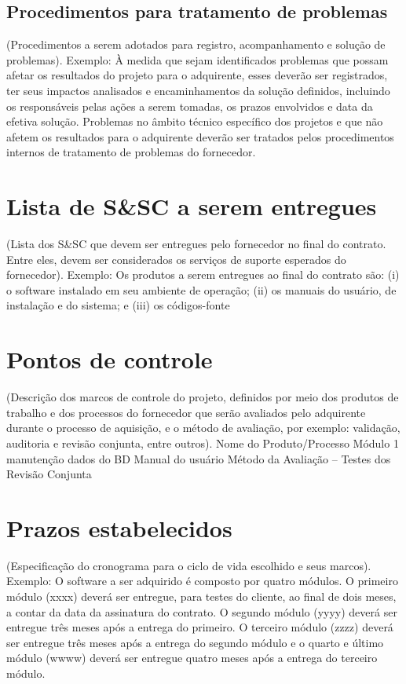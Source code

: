 \subsection{Procedimentos para tratamento de problemas}
(Procedimentos a serem adotados para registro, acompanhamento e
solução de problemas).
Exemplo: À medida que sejam identificados problemas que possam afetar os
resultados do projeto para o adquirente, esses deverão ser registrados, ter
seus impactos analisados e encaminhamentos da solução definidos, incluindo
os responsáveis pelas ações a serem tomadas, os prazos envolvidos e data
da efetiva solução.
Problemas no âmbito técnico específico dos projetos e que não afetem os
resultados para o adquirente deverão ser tratados pelos procedimentos
internos de tratamento de problemas do fornecedor.

\section{Lista de S\&SC a serem entregues}
(Lista dos S\&SC que devem ser entregues pelo fornecedor no final do contrato.
Entre eles, devem ser considerados os serviços de suporte esperados do
fornecedor). Exemplo: Os produtos a serem entregues ao final do contrato são:
(i) o software instalado em seu ambiente de operação;
(ii) os manuais do usuário, de instalação e do sistema; e
(iii) os códigos-fonte

\section{Pontos de controle}
(Descrição dos marcos de controle do projeto, definidos por meio dos produtos
de trabalho e dos processos do fornecedor que serão avaliados pelo adquirente
durante o processo de aquisição, e o método de avaliação, por exemplo: validação,
auditoria e revisão conjunta, entre outros).
Nome
do
Produto/Processo
Módulo
1
manutenção
dados do BD
Manual do usuário
Método da Avaliação
– Testes
dos
Revisão Conjunta

\section{Prazos estabelecidos}
(Especificação do cronograma para o ciclo de vida escolhido e seus marcos).
Exemplo: O software a ser adquirido é composto por quatro módulos. O primeiro
módulo (xxxx) deverá ser entregue, para testes do cliente, ao final de dois meses, a
contar da data da assinatura do contrato. O segundo módulo (yyyy) deverá ser
entregue três meses após a entrega do primeiro. O terceiro módulo (zzzz) deverá ser
entregue três meses após a entrega do segundo módulo e o quarto e último módulo
(wwww) deverá ser entregue quatro meses após a entrega do terceiro módulo.

